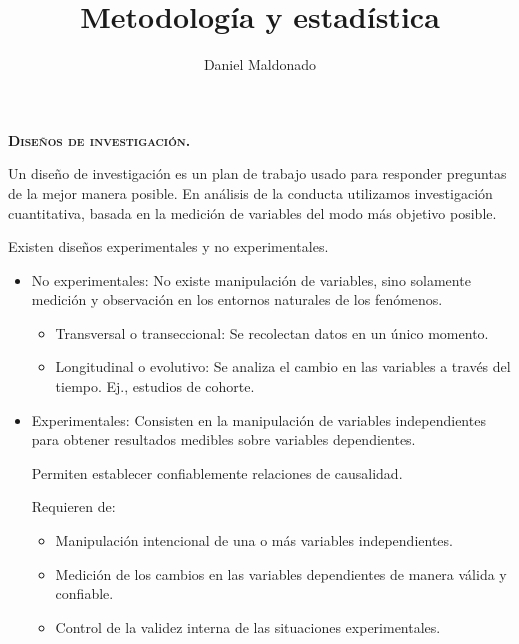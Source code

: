 \documentclass[a4paper,12pt]{article}
\title{Metodología y estadística}
\author{Daniel Maldonado}
\date{}
\begin{document}
{\scshape\bfseries \maketitle}

{\noindent\scshape\bfseries Diseños de investigación.}

Un diseño de investigación es un plan de trabajo usado para responder preguntas de la mejor manera posible. En análisis de la conducta utilizamos investigación cuantitativa, basada en la medición de variables del modo más objetivo posible. 

Existen diseños experimentales y no experimentales.

\begin{itemize}
    \item No experimentales: No existe manipulación de variables, sino solamente medición y observación en los entornos naturales de los fenómenos.
        \begin{itemize}
            \item Transversal o transeccional: Se recolectan datos en un único momento.
            \item Longitudinal o evolutivo: Se analiza el cambio en las variables a través del tiempo. Ej., estudios de cohorte.
        \end{itemize}
    \item Experimentales: Consisten en la manipulación de variables independientes para obtener resultados medibles sobre variables dependientes.

        Permiten establecer confiablemente relaciones de causalidad.

        Requieren de:
        \begin{itemize}
            \item Manipulación intencional de una o más variables independientes.
            \item Medición de los cambios en las variables dependientes de manera válida y confiable.
            \item Control de la validez interna de las situaciones experimentales.
        \end{itemize}


\end{itemize}
\end{document}
